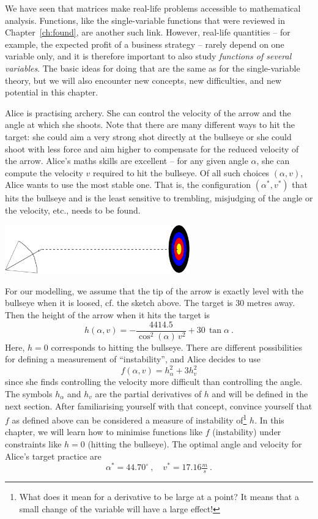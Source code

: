 
We have seen that matrices make real-life problems accessible to mathematical analysis. Functions, like the single-variable functions that were reviewed in Chapter~\ref{ch:found}, are another such link. However, real-life quantities -- for example, the expected profit of a business strategy -- rarely depend on one variable only, and it is therefore important to also study \emph{functions of several variables}. The basic ideas for doing that are the same as for the single-variable theory, but we will also encounter new concepts, new difficulties, and new potential in this chapter.

\begin{application}
Alice is practising archery. She can control the velocity of the arrow and the angle at which she shoots. Note that there are many different ways to hit the target: she could aim a very strong shot directly at the bullseye or she could shoot with less force and aim higher to compensate for the reduced velocity of the arrow. Alice's maths skills are excellent -- for any given angle $\alpha$, she can compute the velocity $v$ required to hit the bullseye. Of all such choices $(\alpha,v)$, Alice wants to use the most stable one. That is, the configuration $(\alpha^*,v^*)$ that hits the bullseye and is the least sensitive to trembling, misjudging of the angle or the velocity, etc., needs to be found.
\begin{center}
	\includegraphics[width=0.6\textwidth]{./Figures/target.pdf}
\end{center}
\end{application}

For our modelling, we assume that the tip of the arrow is exactly level with the bullseye when it is loosed, cf. the sketch above. The target is 30 metres away. Then the height of the arrow when it hits the target is
\[h(\alpha,v) = -\frac{4414.5}{\cos^2(\alpha) \, v^2} + 30 \, \tan\alpha \:. \]
Here, $h=0$ corresponds to hitting the bullseye. There are different possibilities for defining a measurement of ``instability'', and Alice decides to use 
\[ f(\alpha,v) = h_{\alpha}^2 + 3 h_v^2 \]
since she finds controlling the velocity more difficult than controlling the angle. The symbols $h_\alpha$ and $h_v$ are the partial derivatives of $h$ and will be defined in the next section. After familiarising yourself with that concept, convince yourself that $f$ as defined above can be considered a measure of instability of\footnote{What does it mean for a derivative to be large at a point? It means that a small change of the variable will have a large effect!} $h$. In this chapter, we will learn how to minimise functions like $f$ (instability) under constraints like $h=0$ (hitting the bullseye). The optimal angle and velocity for Alice's target practice are
\[\alpha^* = 44.70^{\circ} \:,\quad v^* = 17.16 \tfrac{m}{s} \:. \]

